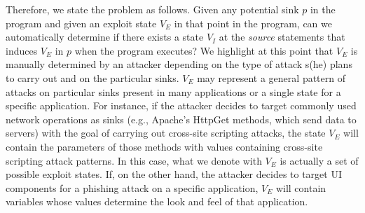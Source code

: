 
Therefore, we state the problem as follows. Given any potential sink $p$ in the program and given an exploit state $V_E$ in that point in the program, can we automatically determine if there exists a state $V_I$ at the \textit{source} statements that induces $V_E$ in $p$ when the program executes? 
{\color{orange} We highlight at this point that $V_E$ is manually determined by an attacker depending on the type of attack s(he) plans to carry out and on the particular sinks.} {\color{blue} $V_E$ may represent a general pattern of attacks on particular sinks present in many applications or a single state for a specific application. For instance, if the attacker decides to target commonly used network operations as sinks (e.g., Apache's HttpGet methods, which send data to servers) with the goal of carrying out cross-site scripting attacks, the state $V_E$ will contain the parameters of those methods with values containing cross-site scripting attack patterns. In this case, what we denote with $V_E$ is actually a set of possible exploit states. If, on the other hand, the attacker decides to target UI components for a phishing attack on a specific application, $V_E$ will contain variables whose values determine the look and feel of that application.}


